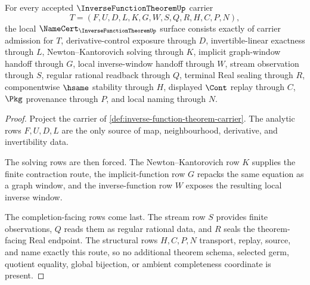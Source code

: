 \begin{theorem}
\label{thm:inverse-function-theorem-namecert-obligations}
For every accepted $\InverseFunctionTheoremUp$ carrier
$$
T=(F,U,D,L,K,G,W,S,Q,R,H,C,P,N),
$$
the local $\NameCert_{\InverseFunctionTheoremUp}$ surface consists exactly of carrier admission for $T$, derivative-control exposure through $D$, invertible-linear exactness through $L$, Newton--Kantorovich solving through $K$, implicit graph-window handoff through $G$, local inverse-window handoff through $W$, stream observation through $S$, regular rational readback through $Q$, terminal Real sealing through $R$, componentwise $\hsame$ stability through $H$, displayed $\Cont$ replay through $C$, $\Pkg$ provenance through $P$, and local naming through $N$.
\end{theorem}
\begin{proof}
Project the carrier of \autoref{def:inverse-function-theorem-carrier}. The analytic rows $F,U,D,L$ are the only source of map, neighbourhood, derivative, and invertibility data.

The solving rows are then forced. The Newton--Kantorovich row $K$ supplies the finite contraction route, the implicit-function row $G$ repacks the same equation as a graph window, and the inverse-function row $W$ exposes the resulting local inverse window.

The completion-facing rows come last. The stream row $S$ provides finite observations, $Q$ reads them as regular rational data, and $R$ seals the theorem-facing Real endpoint. The structural rows $H,C,P,N$ transport, replay, source, and name exactly this route, so no additional theorem schema, selected germ, quotient equality, global bijection, or ambient completeness coordinate is present.
\end{proof}

